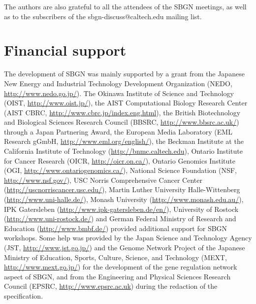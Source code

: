 The authors are also grateful to all the attendees of the SBGN meetings, as well as to the subscribers of the sbgn-discuss@caltech.edu mailing list.

\section{Financial support}

The development of SBGN was mainly supported by a grant from the Japanese New Energy and Industrial Technology Development Organization (NEDO, \url{http://www.nedo.go.jp/}). 
The Okinawa Institute of Science and Technology (OIST, \url{http://www.oist.jp/}), 
the AIST Computational Biology Research Center (AIST CBRC, \url{http://www.cbrc.jp/index.eng.html}), 
the British Biotechnology and Biological Sciences Research Council (BBSRC, \url{http://www.bbsrc.ac.uk/}) through a Japan Partnering Award, 
the European Media Laboratory (EML Research gGmbH, \url{http://www.eml.org/english/}), 
the Beckman Institute at the California Institute of Technology (\url{http://bnmc.caltech.edu}), 
Ontario Institute for Cancer Research (OICR, \url{http://oicr.on.ca/}), 
Ontario Genomics Institute (OGI, \url{http://www.ontariogenomics.ca/}), 
National Science Foundation (NSF, \url{http://www.nsf.gov/}), 
USC Norris Comprehensive Cancer Center (\url{http://uscnorriscancer.usc.edu/}), 
Martin Luther University Halle-Wittenberg (\url{http://www.uni-halle.de/}), 
Monash University (\url{http://www.monash.edu.au/}), 
IPK Gatersleben (\url{http://www.ipk-gatersleben.de/en/}), 
University of Rostock (\url{http://www.uni-rostock.de/})  and 
German Federal Ministry of Research and Education (\url{http://www.bmbf.de/}) provided additional support for SBGN workshops. 
Some help was provided by the Japan Science and Technology Agency (JST, \url{http://www.jst.go.jp/}) and the Genome Network Project of the Japanese Ministry of Education, Sports, Culture, Science, and Technology (MEXT, \url{http://www.mext.go.jp/}) for the development of the gene regulation network aspect of SBGN, and from the Engineering and Physical Sciences Research Council (EPSRC, \url{http://www.epsrc.ac.uk}) during the redaction of the specification.


